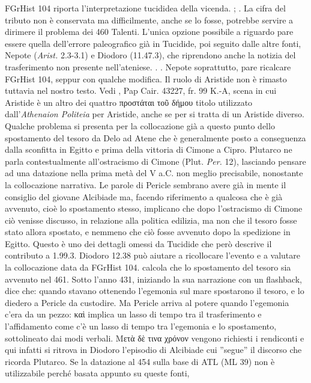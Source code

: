 {            FGrHist 104 riporta l'interpretazione tucididea della vicenda. \cite[130-132]{Badian1993}; \cite[42-67]{Meiggs1972}. La cifra del tributo non è conservata ma difficilmente, anche se lo fosse, potrebbe servire a dirimere il problema dei 460 Talenti. L'unica opzione possibile a riguardo pare essere quella dell'errore paleografico già in Tucidide, poi seguito dalle altre fonti,  Nepote (\emph{Arist.} 2.3-3.1) e  Diodoro (11.47.3), che riprendono anche la notizia del trasferimento non presente nell'ateniese. \cite[130 n240 e 150 n302]{Green2006}. \cite[324-339]{Meiggs1972}.  Nepote soprattutto, pare ricalcare FGrHist 104, seppur con qualche modifica. Il ruolo di Aristide non è rimasto tuttavia nel nostro testo. Vedi \cite[275]{Telo2006}, Pap Cair. 43227, fr. 99 K.-A, scena in cui Aristide è un altro dei quattro \textgreek{προστάται τοῦ δήμου} titolo utilizzato dall'\emph{Athenaion Politeia} per Aristide, anche se per \cite[53]{Fornara1966} si tratta di un Aristide diverso. Qualche problema si presenta per la collocazione già a questo punto dello spostamento del tesoro da Delo ad Atene che è generalmente posto a conseguenza dalla sconfitta in Egitto e prima della vittoria di  Cimone a Cipro. Plutarco ne parla contestualmente all'ostracismo di  Cimone (Plut. \emph{Per.} 12), lasciando pensare ad una datazione nella prima metà del V a.C. non meglio precisabile, nonostante la collocazione narrativa. Le parole di Pericle  sembrano avere già in mente il consiglio del giovane Alcibiade ma, facendo riferimento a qualcosa che è già avvenuto, cioè lo spostamento stesso, implicano che dopo l'ostracismo di  Cimone ciò venisse discusso, in relazione alla politica edilizia, ma non che il tesoro fosse stato allora spostato, e nemmeno che ciò fosse avvenuto dopo la spedizione in Egitto. Questo è uno dei dettagli omessi da Tucidide che però descrive il contributo a 1.99.3.  Diodoro 12.38 può aiutare a ricollocare l'evento e a valutare la collocazione data da FGrHist 104. \cite[422 n.123]{Parmeggiani2011} calcola che lo spostamento del tesoro sia avvenuto nel 461. Sotto l'anno 431, iniziando la sua narrazione con un flashback, dice che: quando stavano ottenendo l'egemonia sul mare spostarono il tesoro, e lo diedero a Pericle  da custodire. Ma Pericle  arriva al potere quando l'egemonia c'era da un pezzo: \textgreek{καὶ} implica un lasso di tempo tra il trasferimento e l'affidamento come c'è un lasso di tempo tra l'egemonia e lo spostamento, sottolineato dai modi verbali. \textgreek{Μετὰ δὲ τινα χρόνον} vengono richiesti i rendiconti e qui infatti si ritrova in  Diodoro l'episodio di Alcibiade cui ''segue'' il discorso che ricorda Plutarco. Se la datazione al 454 sulla base di ATL (ML 39) non è utilizzabile perché basata appunto su queste fonti, }
